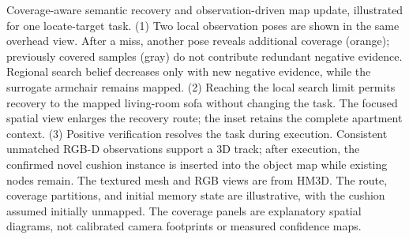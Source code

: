 \caption{Coverage-aware semantic recovery and observation-driven map update, illustrated for one locate-target task. (1) Two local observation poses are shown in the same overhead view. After a miss, another pose reveals additional coverage (orange); previously covered samples (gray) do not contribute redundant negative evidence. Regional search belief decreases only with new negative evidence, while the surrogate armchair remains mapped. (2) Reaching the local search limit permits recovery to the mapped living-room sofa without changing the task. The focused spatial view enlarges the recovery route; the inset retains the complete apartment context. (3) Positive verification resolves the task during execution. Consistent unmatched RGB-D observations support a 3D track; after execution, the confirmed novel cushion instance is inserted into the object map while existing nodes remain. The textured mesh and RGB views are from HM3D. The route, coverage partitions, and initial memory state are illustrative, with the cushion assumed initially unmapped. The coverage panels are explanatory spatial diagrams, not calibrated camera footprints or measured confidence maps.}
\label{fig:semantic-recovery}

